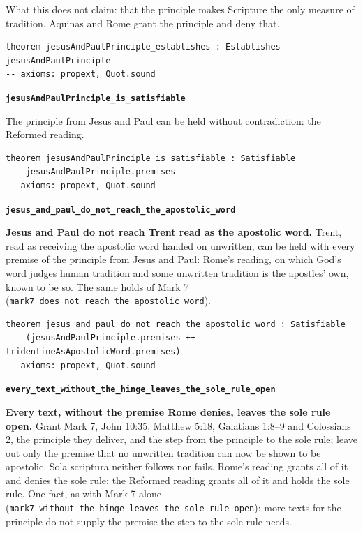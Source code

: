 \documentclass[11pt]{article}
\begin{document}
What this does not claim: that the principle makes Scripture the only measure of tradition. Aquinas and Rome grant the principle and deny that.

{\small\begin{verbatim}
theorem jesusAndPaulPrinciple_establishes : Establishes jesusAndPaulPrinciple
-- axioms: propext, Quot.sound
\end{verbatim}}
\par\medskip\noindent\textbf{\texttt{jesus\allowbreak{}And\allowbreak{}Paul\allowbreak{}Principle\_\allowbreak{}is\_\allowbreak{}satisfiable}}\par\nobreak\noindent
The principle from Jesus and Paul can be held without contradiction: the Reformed reading.

{\small\begin{verbatim}
theorem jesusAndPaulPrinciple_is_satisfiable : Satisfiable
    jesusAndPaulPrinciple.premises
-- axioms: propext, Quot.sound
\end{verbatim}}
\par\medskip\noindent\textbf{\texttt{jesus\_\allowbreak{}and\_\allowbreak{}paul\_\allowbreak{}do\_\allowbreak{}not\_\allowbreak{}reach\_\allowbreak{}the\_\allowbreak{}apostolic\_\allowbreak{}word}}\par\nobreak\noindent
\textbf{Jesus and Paul do not reach Trent read as the apostolic word.} Trent, read as receiving the apostolic word handed on unwritten, can be held with every premise of the principle from Jesus and Paul: Rome’s reading, on which God’s word judges human tradition and some unwritten tradition is the apostles’ own, known to be so. The same holds of Mark 7 (\texttt{mark7\_\allowbreak{}does\_\allowbreak{}not\_\allowbreak{}reach\_\allowbreak{}the\_\allowbreak{}apostolic\_\allowbreak{}word}).

{\small\begin{verbatim}
theorem jesus_and_paul_do_not_reach_the_apostolic_word : Satisfiable
    (jesusAndPaulPrinciple.premises ++ tridentineAsApostolicWord.premises)
-- axioms: propext, Quot.sound
\end{verbatim}}
\par\medskip\noindent\textbf{\texttt{every\_\allowbreak{}text\_\allowbreak{}without\_\allowbreak{}the\_\allowbreak{}hinge\_\allowbreak{}leaves\_\allowbreak{}the\_\allowbreak{}sole\_\allowbreak{}rule\_\allowbreak{}open}}\par\nobreak\noindent
\textbf{Every text, without the premise Rome denies, leaves the sole rule open.} Grant Mark 7, John 10:35, Matthew 5:18, Galatians 1:8–9 and Colossians 2, the principle they deliver, and the step from the principle to the sole rule; leave out only the premise that no unwritten tradition can now be shown to be apostolic. Sola scriptura neither follows nor fails. Rome’s reading grants all of it and denies the sole rule; the Reformed reading grants all of it and holds the sole rule. One fact, as with Mark 7 alone (\texttt{mark7\_\allowbreak{}without\_\allowbreak{}the\_\allowbreak{}hinge\_\allowbreak{}leaves\_\allowbreak{}the\_\allowbreak{}sole\_\allowbreak{}rule\_\allowbreak{}open}): more texts for the principle do not supply the premise the step to the sole rule needs.
\end{document}
